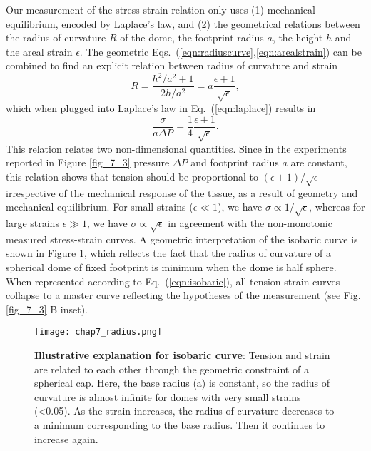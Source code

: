 Our measurement of the stress-strain relation only uses (1) mechanical equilibrium, encoded by Laplace's law, and (2) the geometrical relations between the radius of curvature $R$ of the dome, the footprint radius $a$, the height $h$ and the areal strain $\epsilon$. The geometric Eqs.~(\ref{eqn:radiuscurve},\ref{eqn:arealstrain}) can be combined to find an explicit relation between radius of curvature and strain
\begin{equation}
	R = \frac{h^2/a^2 + 1}{2h/a^2} = a\frac{\epsilon + 1}{\sqrt{\epsilon}},
\end{equation}
which when plugged into Laplace's law in Eq.~(\ref{eqn:laplace}) results in 
\begin{equation}
	\label{eqn:isobaric}
	\frac{\sigma}{a \Delta P} = \frac{1}{4}  \frac{\epsilon + 1}{\sqrt{\epsilon}}.
\end{equation}
This relation relates two non-dimensional quantities. Since in the experiments reported in Figure \ref{fig_7_3} pressure $\Delta P$ and footprint radius $a$ are constant, this relation shows that tension should be proportional to $(\epsilon + 1)/\sqrt{\epsilon}$ irrespective of the mechanical response of the tissue, as a result of geometry and mechanical equilibrium. For small strains ($\epsilon\ll 1$), we have $\sigma \propto 1/\sqrt{\epsilon}$, whereas for large strains $\epsilon\gg 1$, we have $\sigma \propto \sqrt{\epsilon}$ in agreement with the non-monotonic measured stress-strain curves. A geometric interpretation of the isobaric curve is shown in Figure \ref{fig_7_4}, which reflects the fact that the radius of curvature of a spherical dome of fixed footprint is minimum when the dome is half sphere. When represented according to Eq.~(\ref{eqn:isobaric}), all tension-strain curves collapse to a master curve reflecting the hypotheses of the measurement (see Fig. \ref{fig_7_3} B inset).

\begin{figure}
	\centering
	\texttt{[image: chap7\_radius.png]}
	\caption{\label{fig_7_4} \textbf{Illustrative explanation for isobaric curve}: Tension and strain are related to each other through the geometric constraint of a spherical cap. Here, the base radius (a) is constant, so the radius of curvature is almost infinite for domes with very small strains (<0.05). As the strain increases, the radius of curvature decreases to a minimum corresponding to the base radius. Then it continues to increase again.	
	}
\end{figure}

